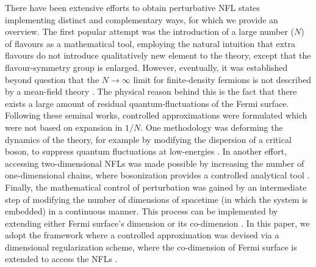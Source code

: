 \documentclass[aps, prb, onecolumn, nofootinbib, citeautoscript, 10pt]{revtex4-2}
\begin{document}
There have been extensive efforts to obtain perturbative NFL states implementing distinct and complementary ways, for which we provide an overview. The first popular attempt was the introduction of a large number ($N$) of flavours \cite{ALTSHULER,polchinski,ybkim} as a mathematical tool, employing the natural intuition that extra flavours do not introduce qualitatively new element to the theory, except that the flavour-symmetry group is enlarged. However, eventually, it was established beyond question that the $N \rightarrow \infty$ limit for finite-density fermions is not described by a mean-field theory \cite{SSLee, metlsach1}. The physical reason behind this is the fact that there exists a large amount of residual quantum-fluctuations of the Fermi surface. Following these seminal works, controlled approximations were formulated which were not based on expansion in $1/N$.
One methodology was deforming the dynamics of the theory, for example by modifying the dispersion of a critical boson, to suppress quantum fluctuations at low-energies \cite{nayak, mross}. In another effort, accessing two-dimensional NFLs was made possible by increasing the number of one-dimensional chains, where bosonization provides a controlled analytical tool \cite{Jiang}.
Finally, the mathematical control of perturbation was gained by an intermediate step of modifying the number of dimensions of spacetime (in which the system is embedded) in a continuous manner. This process can be implemented by extending either Fermi surface's dimension \cite{olav} or its co-dimension \cite{senshank}. In this paper, we adopt the framework where a controlled approximation was devised via a dimensional regularization scheme, where the co-dimension of Fermi surface is extended to access the NFLs \cite{Lee-Dalid, ips-uv-ir1}.
\end{document}
